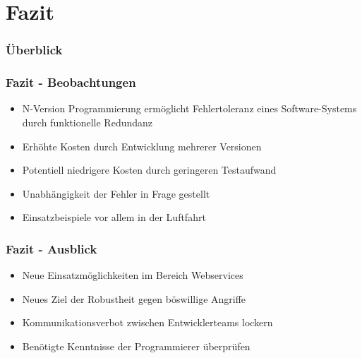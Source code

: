 \section{Fazit}
\begin{frame}
	\frametitle{Überblick}
	\tableofcontents[currentsection]
\end{frame}
%
\begin{frame}
	\frametitle{Fazit - Beobachtungen}

	\begin{itemize}
		\item N-Version Programmierung ermöglicht Fehlertoleranz eines Software-Systems durch funktionelle Redundanz
		\item Erhöhte Kosten durch Entwicklung mehrerer Versionen
		\item Potentiell niedrigere Kosten durch geringeren Testaufwand
		\item Unabhängigkeit der Fehler in Frage gestellt
		\item Einsatzbeispiele vor allem in der Luftfahrt
	\end{itemize}
\end{frame}
%
%
\begin{frame}
	\frametitle{Fazit - Ausblick}
	
	\begin{itemize}
		\item Neue Einsatzmöglichkeiten im Bereich Webservices
		\item Neues Ziel der Robustheit gegen böswillige Angriffe
		\item Kommunikationsverbot zwischen Entwicklerteams lockern
		\item Benötigte Kenntnisse der Programmierer überprüfen
	\end{itemize}
\end{frame}
%
